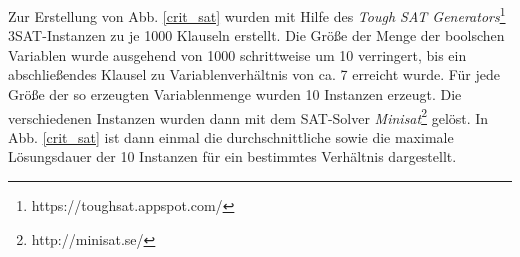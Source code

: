Zur Erstellung von Abb. \ref{crit_sat} wurden mit Hilfe des \emph{Tough SAT Generators}\footnote{https://toughsat.appspot.com/} 3SAT-Instanzen zu je 1000 Klauseln erstellt. Die Größe der  Menge der boolschen Variablen wurde ausgehend von 1000 schrittweise um 10 verringert, bis ein abschließendes Klausel zu Variablenverhältnis von ca. 7 erreicht wurde. Für jede Größe der so erzeugten Variablenmenge wurden 10 Instanzen erzeugt. Die verschiedenen Instanzen wurden dann mit dem SAT-Solver \emph{Minisat}\footnote{http://minisat.se/} gelöst. In Abb. \ref{crit_sat} ist dann einmal die durchschnittliche sowie die maximale Lösungsdauer der 10 Instanzen für ein bestimmtes Verhältnis dargestellt.
%
%
%
%
